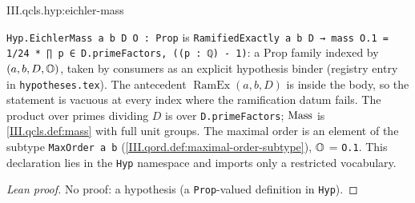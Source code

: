 \begin{hypothesis}
\end{hypothesis}
\begin{tfformal}{III.qcls.hyp:eichler-mass}
\begin{tffidelity}
\texttt{Hyp.EichlerMass a b D O : Prop} is \texttt{RamifiedExactly a b D → mass O.1 = 1/24 * ∏ p ∈ D.primeFactors, ((p : ℚ) - 1)}: a Prop family indexed by $(a,b,D,\mathbb{O})$, taken by consumers as an explicit hypothesis binder (registry entry in \texttt{hypotheses.tex}). The antecedent $\operatorname{RamEx}(a,b,D)$ is inside the body, so the statement is vacuous at every index where the ramification datum fails. The product over primes dividing $D$ is over \texttt{D.primeFactors}; $\operatorname{Mass}$ is \cref{III.qcls.def:mass} with full unit groups. The maximal order is an element of the subtype \texttt{MaxOrder a b} (\cref{III.qord.def:maximal-order-subtype}), $\mathbb{O}$ = \texttt{O.1}. This declaration lies in the \texttt{Hyp} namespace and imports only a restricted vocabulary.
\end{tffidelity}
\end{tfformal}
\begin{proof}[Lean proof]
No proof: a hypothesis (a \texttt{Prop}-valued definition in \texttt{Hyp}).
\end{proof}

